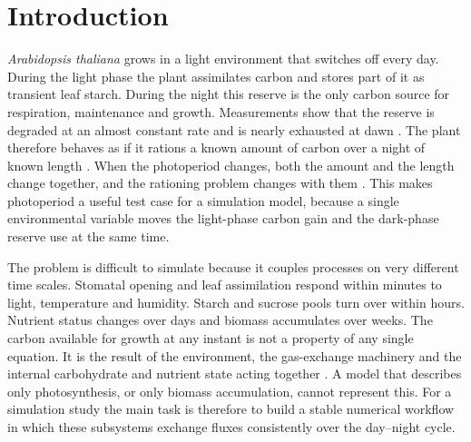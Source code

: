 \section{Introduction}
\label{sec:intro}

\textit{Arabidopsis thaliana} grows in a light environment that switches off
every day. During the light phase the plant assimilates carbon and stores part
of it as transient leaf starch. During the night this reserve is the only carbon
source for respiration, maintenance and growth. Measurements show that the
reserve is degraded at an almost constant rate and is nearly exhausted at dawn
\cite{Graf2010,Smith2007}. The plant therefore behaves as if it rations a known
amount of carbon over a night of known length \cite{Scialdone2013}. When the
photoperiod changes, both the amount and the length change together, and the
rationing problem changes with them \cite{Sulpice2014,Stitt2012}. This makes
photoperiod a useful test case for a simulation model, because a single
environmental variable moves the light-phase carbon gain and the dark-phase
reserve use at the same time.

The problem is difficult to simulate because it couples processes on very
different time scales. Stomatal opening and leaf assimilation respond within
minutes to light, temperature and humidity. Starch and sucrose pools turn over
within hours. Nutrient status changes over days and biomass accumulates over
weeks. The carbon available for growth at any instant is not a property of any
single equation. It is the result of the environment, the gas-exchange
machinery and the internal carbohydrate and nutrient state acting together
\cite{Farquhar1980,ThornleyJohnson1990}. A model that describes only
photosynthesis, or only biomass accumulation, cannot represent this. For a
simulation study the main task is therefore to build a stable numerical
workflow in which these subsystems exchange fluxes consistently over the
day--night cycle.


